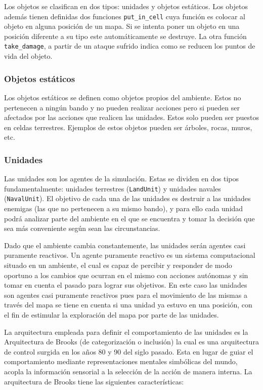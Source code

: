 Los objetos se clasifican en dos tipos: unidades y objetos estáticos. Los objetos además tienen definidas dos funciones \verb|put_in_cell| cuya función es colocar al objeto en alguna posición de un mapa. Si se intenta poner un objeto en una posición diferente a su tipo este automáticamente se destruye. La otra función \verb|take_damage|, a partir de un ataque sufrido indica como se reducen los puntos de vida del objeto.

\subsubsection{Objetos estáticos}

Los objetos estáticos se definen como objetos propios del ambiente. Estos no pertenecen a ningún bando y no pueden realizar acciones pero si pueden ser afectados por las acciones que realicen las unidades. Estos solo pueden ser puestos en celdas terrestres. Ejemplos de estos objetos pueden ser árboles, rocas, muros, etc.

\subsubsection{Unidades}

Las unidades son los agentes de la simulación. Estas se dividen en dos tipos fundamentalmente: unidades terrestres (\verb|LandUnit|) y unidades navales (\verb|NavalUnit|). El objetivo de cada una de las unidades es destruir a las unidades enemigas (las que no pertenecen a su mismo bando), y para ello cada unidad podrá analizar parte del ambiente en el que se encuentra y tomar la decisión que sea más conveniente según sean las circunstancias. 

Dado que el ambiente cambia constantemente, las unidades serán agentes casi puramente reactivos. Un agente puramente reactivo es un sistema computacional situado en un ambiente, el cual es capaz de percibir y responder de modo oportuno a los cambios que ocurran en el mismo con  acciones autónomas y sin tomar en cuenta el pasado para lograr sus objetivos. En este caso las unidades son agentes casi puramente reactivos pues para el movimiento de las mismas a través del mapa se tiene en cuenta si una unidad ya estuvo en una posición, con el fin de estimular la exploración del mapa por parte de las unidades.

La arquitectura empleada para definir el comportamiento de las unidades es la Arquitectura de Brooks (de categorización o inclusión) la cual es una arquitectura de control surgida en los años 80 y 90 del siglo pasado. Esta en lugar de guiar el comportamiento mediante representaciones mentales simbólicas del mundo, acopla la información sensorial  a la selección de la acción de manera interna. La arquitectura de Brooks tiene las siguientes características: 

